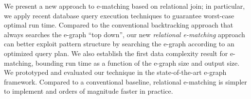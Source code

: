 
We present a new approach to e-matching
  based on relational join;
  in particular,
  we apply recent database query execution techniques
  to guarantee worst-case optimal run time.
Compared to the conventional backtracking approach
  that always searches the e-graph ``top down'',
  our new \textit{relational e-matching} approach
  can better exploit pattern structure
  by searching the e-graph according to an optimized query plan.
We also establish the first
  data complexity result for e-matching,
  bounding run time as a function
  of the e-graph size and output size.
We prototyped and evaluated our technique in the
  state-of-the-art \egg e-graph framework.
Compared to a
  conventional baseline,
  relational e-matching is
  simpler to implement and
  orders of magnitude faster in practice.

